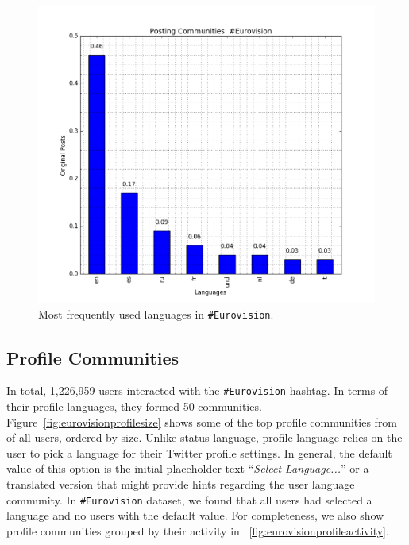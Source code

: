 \begin{figure}[htb]
\centering
\includegraphics[width=\columnwidth]{images/eurovision_langfreq.png}
\caption{Most frequently used languages in {\texttt{\#Eurovision}}.}
\label{fig:eurovisionlangfreq}
\end{figure}

\subsection{Profile Communities}\label{ppcomm}

In total, 1,226,959 users interacted with the {\texttt{\#Eurovision}}
hashtag. In terms of their profile languages, they formed 50
communities. Figure~\ref{fig:eurovisionprofilesize} shows some of the
top profile communities from of all users, ordered by size. Unlike
status language, profile language relies on the user to pick a
language for their Twitter profile settings. In general, the default
value of this option is the initial placeholder text ``{\emph{Select
Language...}}'' or a translated version that might provide hints
regarding the user language community. In {\texttt{\#Eurovision}}
dataset, we found that all users had selected a language and no users
with the default value.  For completeness, we also show profile
communities grouped by their activity in
~\ref{fig:eurovisionprofileactivity}.

